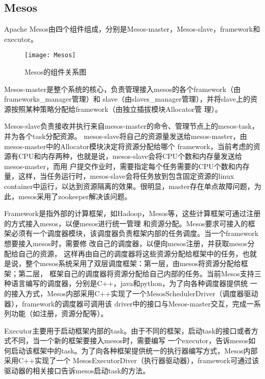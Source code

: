 \subsection{Mesos}

Apache Mesos由四个组件组成，分别是Mesos-master，Mesos-slave，framework和executor。
\begin{figure}[htbp]
\centering\texttt{[image: Mesos]}
\caption{Mesos的组件关系图}\label{fig:openstack}
\end{figure}
Mesos-master是整个系统的核心，负责管理接入mesos的各个framework（由frameworks\_manager管理）和 slave（由slaves\_manager管理），并将slave上的资源按照某种策略分配给framework（由独立插拔模块Allocator管 理）。

Mesos-slave负责接收并执行来自mesos-master的命令、管理节点上的mesos-task，并为各个task分配资源。 mesos-slave将自己的资源量发送给mesos-master，由mesos-master中的Allocator模块决定将资源分配给哪个 framework，当前考虑的资源有CPU和内存两种，也就是说，mesos-slave会将CPU个数和内存量发送给mesos-master，而用 户提交作业时，需要指定每个任务需要的CPU个数和内存量，这样，当任务运行时，mesos-slave会将任务放到包含固定资源的linux container中运行，以达到资源隔离的效果。很明显，master存在单点故障问题，为此，mesos采用了zookeeper解决该问题。

Framework是指外部的计算框架，如Hadoop，Mesos等，这些计算框架可通过注册的方式接入mesos，以便mesos进行统一管理 和资源分配。Mesos要求可接入的框架必须有一个调度器模块，该调度器负责框架内部的任务调度。当一个framework想要接入mesos时，需要修 改自己的调度器，以便向mesos注册，并获取mesos分配给自己的资源， 这样再由自己的调度器将这些资源分配给框架中的任务，也就是说，整个mesos系统采用了双层调度框架：第一层，由mesos将资源分配给框架；第二层， 框架自己的调度器将资源分配给自己内部的任务。当前Mesos支持三种语言编写的调度器，分别是C++，java和python，为了向各种调度器提供统 一的接入方式，Mesos内部采用C++实现了一个MesosSchedulerDriver（调度器驱动器），framework的调度器可调用该 driver中的接口与Mesos-master交互，完成一系列功能（如注册，资源分配等）。

Executor主要用于启动框架内部的task。由于不同的框架，启动task的接口或者方式不同，当一个新的框架要接入mesos时，需要编写 一个executor，告诉mesos如何启动该框架中的task。为了向各种框架提供统一的执行器编写方式，Mesos内部采用C++实现了一个 MesosExecutorDiver（执行器驱动器），framework可通过该驱动器的相关接口告诉mesos启动task的方法。

